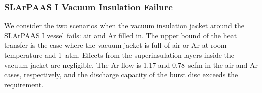 \subsubsection{SLArPAAS I Vacuum Insulation Failure}

We consider the two scenarios when the vacuum insulation jacket around the
SLArPAAS I vessel fails: air and Ar filled in.
The upper bound of the heat transfer is the case where the vacuum jacket
is full of air or Ar at room temperature and 1~atm.
Effects from the superinsulation layers inside the vacuum jacket are negligible.
The Ar flow is 1.17 and 0.78~scfm in the air and Ar cases, respectively,
and the discharge capacity of the burst disc exceeds the requirement.
